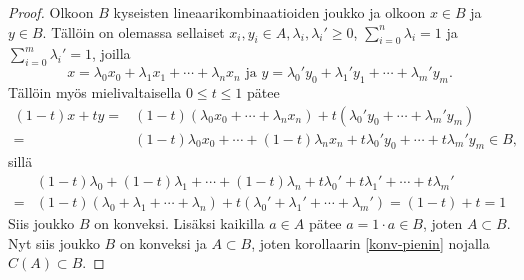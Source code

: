 \documentclass[12pt,a4paper,leqno]{report}
\newcommand{\R}{\mathbb{R}}
\theoremstyle{plain}
\theoremstyle{definition}
\theoremstyle{remark}
\begin{document}
\begin{proof}
Olkoon $B$ kyseisten lineaarikombinaatioiden joukko ja olkoon $x\in B$ ja $y\in B$. 
Tällöin on olemassa sellaiset $x_i,y_i\in A, \lambda_i,\lambda_i'\geq0$, $\sum_{i=0}^{n}{\lambda_i}=1$ ja $\sum_{i=0}^{m}{\lambda_i'}=1$, joilla
\begin{equation*}
x=\lambda_0 x_0+\lambda_1 x_1+\cdots+\lambda_{n} x_{n}\text{ ja }y=\lambda_0' y_0+\lambda_1' y_1+\cdots+\lambda_{m}' y_{m}.
\end{equation*} 
Tällöin myös mielivaltaisella $0\leq t \leq 1$ pätee
\begin{equation*}
\begin{split}
 (1-t)x+ty=&(1-t)(\lambda_0 x_0+\cdots+\lambda_{n} x_{n})+t(\lambda_0' y_0 +\cdots+\lambda_{m}' y_{m})\\
=&(1-t)\lambda_0 x_0+\cdots+(1-t)\lambda_{n} x_{n}+t\lambda_0' y_0+\cdots+t\lambda_{m}' y_{m}\in B,
\end{split}
\end{equation*}
sillä
\begin{equation*}
\begin{split}
&(1-t)\lambda_0 +(1-t)\lambda_1 +\cdots+(1-t)\lambda_{n} +t\lambda_0' +t\lambda_1' +\cdots+t\lambda_{m}' \\
=& (1-t)(\lambda_0 +\lambda_1 +\cdots+\lambda_{n} )+t(\lambda_0'  +\lambda_1'  +\cdots+\lambda_{m}' )
= (1-t)+t=1
\end{split}
\end{equation*}
Siis joukko $B$ on konveksi.
Lisäksi kaikilla $a\in A$ pätee $a=1\cdot a \in B$, joten $A\subset B$. Nyt siis joukko $B$ on konveksi ja $A\subset B$, joten korollaarin \ref{konv-pienin} nojalla $C(A)\subset B$.
%
\end{proof}
\end{document}

